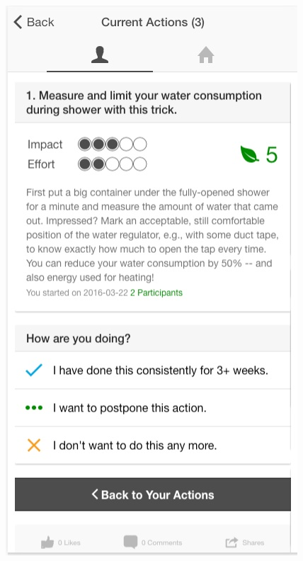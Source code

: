 \begin{figure}[b!]
\begin{center}
\begin{minipage}[t!]{0.31\linewidth}
        	       \includegraphics[width=1\linewidth]{img/Your_Actions.jpg}
                \end{minipage}
        \begin{minipage}[t!]{0.33\linewidth}    

\end{minipage}
\end{center}
\end{figure}
